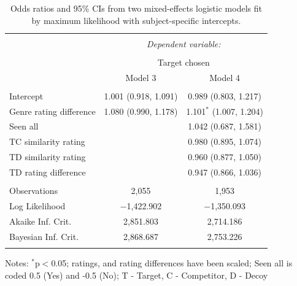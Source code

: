 \documentclass[12pt, a4paper]{article}
\begin{document}
\begin{appendices}
\begin{table}[htb!]
\centering
  \begin{threeparttable}
    \caption{Odds ratios and 95\% CIs from two mixed-effects logistic models fit by maximum likelihood with subject-specific intercepts.}
  \label{latentattr_exp3reg}
\begin{tabular}{@{\extracolsep{5pt}}lcc} 
\\[-1.8ex]\hline 
\hline \\[-1.8ex] 
 & \multicolumn{2}{c}{\textit{Dependent variable:}} \\ 
\cline{2-3} 
\\[-1.8ex] & \multicolumn{2}{c}{Target chosen} \\ 
 & Model 3 & Model 4 \\ 
\hline \\[-1.8ex] 
Intercept & 1.001 (0.918, 1.091) & 0.989 (0.803, 1.217) \\ 
 Genre rating difference & 1.080 (0.990, 1.178) & 1.101$^{*}$ (1.007, 1.204) \\  
 Seen all &  & 1.042 (0.687, 1.581) \\ 
  TC similarity rating &  & 0.980 (0.895, 1.074) \\ 
  TD similarity rating &  & 0.960 (0.877, 1.050) \\ 
  TD rating difference &  & 0.947 (0.866, 1.036) \\ 
   \hline \\[-1.8ex]
Observations & 2,055 & 1,953 \\ 
Log Likelihood & $-$1,422.902 & $-$1,350.093 \\ 
Akaike Inf. Crit. & 2,851.803 & 2,714.186 \\ 
Bayesian Inf. Crit. & 2,868.687 & 2,753.226 \\ 
\hline 
\hline \\[-1.8ex] 
\end{tabular} 
    \begin{tablenotes}
      \small
      \item Notes: $^{*}$p$<$0.05; ratings, and rating differences have been scaled; Seen all is coded 0.5 (Yes) and -0.5 (No); T - Target, C - Competitor, D - Decoy
    \end{tablenotes}
  \end{threeparttable}
\end{table}



\end{appendices}
\end{document}
